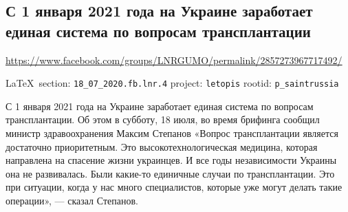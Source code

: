  
 
\subsection{С 1 января 2021 года на Украине заработает единая система по вопросам
трансплантации}
\url{https://www.facebook.com/groups/LNRGUMO/permalink/2857273967717492/}
  
\vspace{0.5cm}
{\small\LaTeX~section: \verb|18_07_2020.fb.lnr.4| project: \verb|letopis| rootid: \verb|p_saintrussia|}
\vspace{0.5cm}

С 1 января 2021 года на Украине заработает единая система по вопросам
трансплантации. Об этом в субботу, 18 июля, во время брифинга сообщил министр
здравоохранения Максим Степанов «Вопрос трансплантации является достаточно
приоритетным. Это высокотехнологическая медицина, которая направлена на
спасение жизни украинцев. И все годы независимости Украины она не развивалась.
Были какие-то единичные случаи по трансплантации. Это при ситуации, когда у нас
много специалистов, которые уже могут делать такие операции», — сказал
Степанов.  
